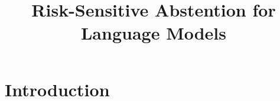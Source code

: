 \documentclass[11pt]{article}
\title{Risk-Sensitive Abstention for Language Models}
\author{}
\date{}
\begin{document}
\maketitle

\section{Introduction}
\end{document}
